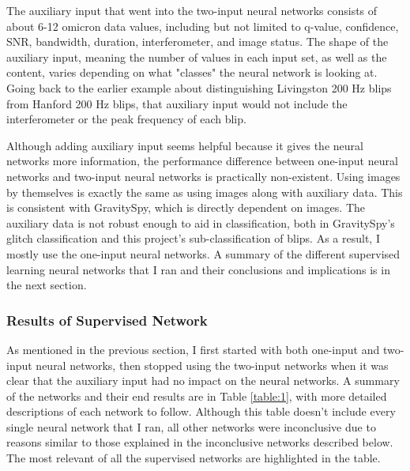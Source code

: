 \documentclass[a4paper]{article}
\begin{document}
The auxiliary input that went into the two-input neural networks consists of about 6-12 omicron data values, including but not limited to q-value, confidence, SNR, bandwidth, duration, interferometer, and image status. The shape of the auxiliary input, meaning the number of values in each input set, as well as the content, varies depending on what "classes" the neural network is looking at. Going back to the earlier example about distinguishing Livingston 200 Hz blips from Hanford 200 Hz blips, that auxiliary input would not include the interferometer or the peak frequency of each blip. 

Although adding auxiliary input seems helpful because it gives the neural networks more information, the performance difference between one-input neural networks and two-input neural networks is practically non-existent. Using images by themselves is exactly the same as using images along with auxiliary data. This is consistent with GravitySpy, which is directly dependent on images. The auxiliary data is not robust enough to aid in classification, both in GravitySpy's glitch classification and this project's sub-classification of blips. As a result, I mostly use the one-input neural networks. A summary of the different supervised learning neural networks that I ran and their conclusions and implications is in the next section.

\subsubsection{Results of Supervised Network}

As mentioned in the previous section, I first started with both one-input and two-input neural networks, then stopped using the two-input networks when it was clear that the auxiliary input had no impact on the neural networks. A summary of the networks and their end results are in Table \ref{table:1}, with more detailed descriptions of each network to follow. Although this table doesn't include every single neural network that I ran, all other networks were inconclusive due to reasons similar to those explained in the inconclusive networks described below. The most relevant of all the supervised networks are highlighted in the table.

\end{document}
